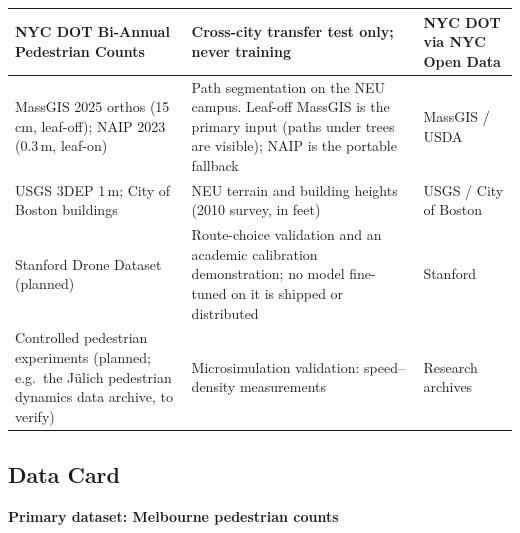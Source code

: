 \documentclass[11pt]{article}
\begin{document}
\begin{xltabular}{\linewidth}{|L{3.6cm}|Y|L{3.4cm}|}
NYC DOT Bi-Annual Pedestrian Counts & Cross-city transfer test only; never training & NYC DOT via NYC Open Data \\\hline
MassGIS 2025 orthos (15\,cm, leaf-off); NAIP 2023 (0.3\,m, leaf-on) & Path segmentation on the NEU campus. Leaf-off MassGIS is the primary input (paths under trees are visible); NAIP is the portable fallback & MassGIS / USDA \\\hline
USGS 3DEP 1\,m; City of Boston buildings & NEU terrain and building heights (2010 survey, in feet) & USGS / City of Boston \\\hline
Stanford Drone Dataset (planned) & Route-choice validation and an academic calibration demonstration; no model fine-tuned on it is shipped or distributed & Stanford \\\hline
Controlled pedestrian experiments (planned; e.g.\ the J\"ulich pedestrian dynamics data archive, to verify) & Microsimulation validation: speed--density measurements & Research archives \\\hline
\end{xltabular}

\subsection{Data Card}

\textbf{Primary dataset: Melbourne pedestrian counts}
\end{document}
